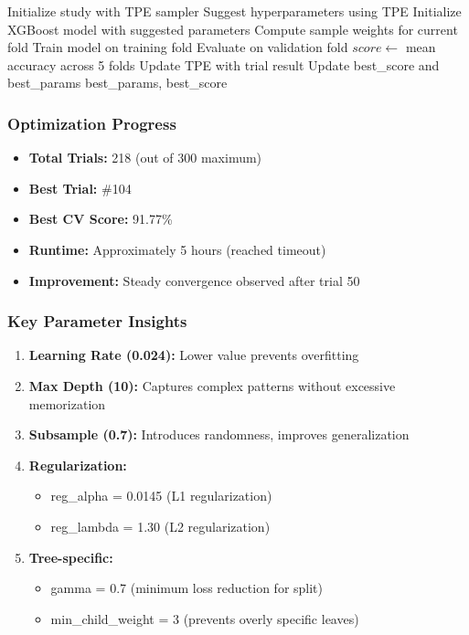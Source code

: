 \documentclass[12pt,a4paper]{article}
\begin{document}
\begin{algorithm}[H]
\caption{Optuna Hyperparameter Optimization}
\begin{algorithmic}[1]
\State Initialize study with TPE sampler
    \State Suggest hyperparameters using TPE
    \State Initialize XGBoost model with suggested parameters
        \State Compute sample weights for current fold
        \State Train model on training fold
        \State Evaluate on validation fold
    \EndFor
    \State $score \gets$ mean accuracy across 5 folds
    \State Update TPE with trial result
        \State Update best\_score and best\_params
    \EndIf
\EndFor
\State \Return best\_params, best\_score
\end{algorithmic}
\end{algorithm}

\subsubsection{Optimization Progress}
\begin{itemize}
    \item \textbf{Total Trials:} 218 (out of 300 maximum)
    \item \textbf{Best Trial:} \#104
    \item \textbf{Best CV Score:} 91.77\%
    \item \textbf{Runtime:} Approximately 5 hours (reached timeout)
    \item \textbf{Improvement:} Steady convergence observed after trial 50
\end{itemize}

\subsubsection{Key Parameter Insights}
\begin{enumerate}
    \item \textbf{Learning Rate (0.024):} Lower value prevents overfitting
    \item \textbf{Max Depth (10):} Captures complex patterns without excessive memorization
    \item \textbf{Subsample (0.7):} Introduces randomness, improves generalization
    \item \textbf{Regularization:}
    \begin{itemize}
        \item reg\_alpha = 0.0145 (L1 regularization)
        \item reg\_lambda = 1.30 (L2 regularization)
    \end{itemize}
    \item \textbf{Tree-specific:}
    \begin{itemize}
        \item gamma = 0.7 (minimum loss reduction for split)
        \item min\_child\_weight = 3 (prevents overly specific leaves)
    \end{itemize}
\end{enumerate}
\end{document}
